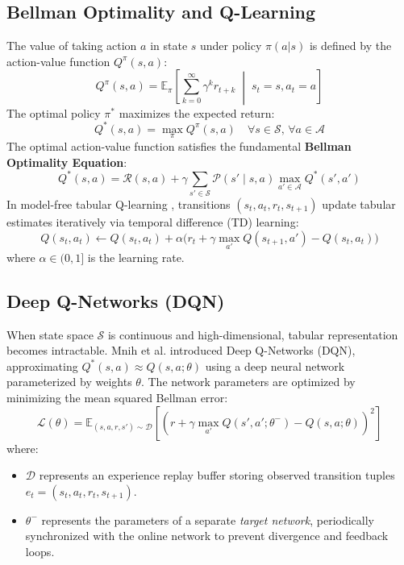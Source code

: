 \documentclass[12pt,a4paper,oneside]{report}
\begin{document}
\subsection{Bellman Optimality and Q-Learning}
The value of taking action $a$ in state $s$ under policy $\pi(a|s)$ is defined by the action-value function $Q^\pi(s, a)$:
\begin{equation}
    Q^\pi(s, a) = \mathbb{E}_\pi \left[ \sum_{k=0}^\infty \gamma^k r_{t+k} \;\middle|\; s_t = s, a_t = a \right]
\end{equation}
The optimal policy $\pi^*$ maximizes the expected return:
\begin{equation}
    Q^*(s, a) = \max_\pi Q^\pi(s, a) \quad \forall s \in \mathcal{S}, \, \forall a \in \mathcal{A}
\end{equation}
The optimal action-value function satisfies the fundamental \textbf{Bellman Optimality Equation}:
\begin{equation}
    Q^*(s, a) = \mathcal{R}(s, a) + \gamma \sum_{s' \in \mathcal{S}} \mathcal{P}(s' \mid s, a) \max_{a' \in \mathcal{A}} Q^*(s', a')
    \label{eq:bellman_optimality}
\end{equation}
In model-free tabular Q-learning \cite{sutton2018reinforcement}, transitions $(s_t, a_t, r_t, s_{t+1})$ update tabular estimates iteratively via temporal difference (TD) learning:
\begin{equation}
    Q(s_t, a_t) \gets Q(s_t, a_t) + \alpha \Big( r_t + \gamma \max_{a'} Q(s_{t+1}, a') - Q(s_t, a_t) \Big)
\end{equation}
where $\alpha \in (0, 1]$ is the learning rate.

\subsection{Deep Q-Networks (DQN)}
When state space $\mathcal{S}$ is continuous and high-dimensional, tabular representation becomes intractable. Mnih et al. \cite{mnih2015human} introduced Deep Q-Networks (DQN), approximating $Q^*(s, a) \approx Q(s, a; \theta)$ using a deep neural network parameterized by weights $\theta$. The network parameters are optimized by minimizing the mean squared Bellman error:
\begin{equation}
    \mathcal{L}(\theta) = \mathbb{E}_{(s, a, r, s') \sim \mathcal{D}} \left[ \left( r + \gamma \max_{a'} Q(s', a'; \theta^-) - Q(s, a; \theta) \right)^2 \right]
\end{equation}
where:
\begin{itemize}
    \item $\mathcal{D}$ represents an experience replay buffer storing observed transition tuples $e_t = (s_t, a_t, r_t, s_{t+1})$.
    \item $\theta^-$ represents the parameters of a separate \emph{target network}, periodically synchronized with the online network to prevent divergence and feedback loops.
\end{itemize}
\end{document}
